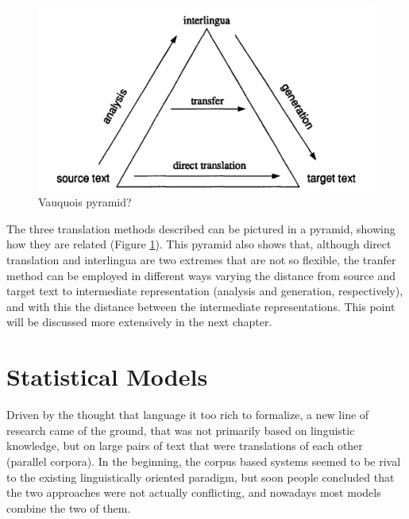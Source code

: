 \documentclass{report}
\theoremstyle{definition}
\theoremstyle{plain}
\begin{document}
\begin{figure}[!ht]
\includegraphics[scale=0.2]{translation_triangle.png}
\caption{Vauquois pyramid?}\label{fig:triangle}
\end{figure}

The three translation methods described can be pictured in a pyramid, showing how they are related (Figure \ref{fig:triangle}). This pyramid also shows that, although direct translation and interlingua are two extremes that are not so flexible, the tranfer method can be employed in different ways varying the distance from source and target text to intermediate representation (analysis and generation, respectively), and with this the distance between the intermediate representations. This point will be discussed more extensively in the next chapter.

\section{Statistical Models}

Driven by the thought that language it too rich to formalize, a new line of research came of the ground, that was not primarily based on linguistic knowledge, but on large pairs of text that were translations of each other (parallel corpora). In the beginning, the corpus based systems seemed to be rival to the existing linguistically oriented paradigm, but soon people concluded that the two approaches were not actually conflicting, and nowadays most models combine the two of them.
\end{document}
